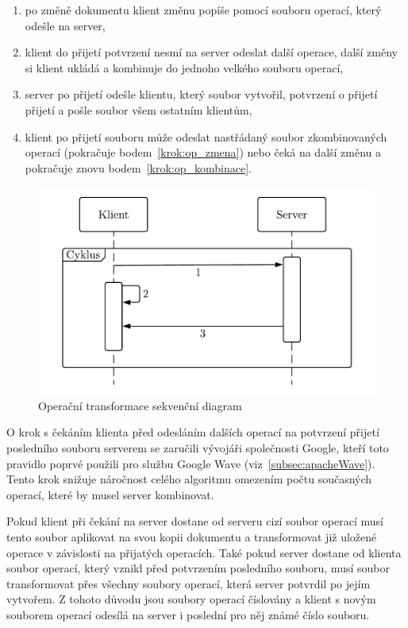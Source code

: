 \begin{enumerate}
    \item po změně dokumentu klient změnu popíše pomocí souboru operací, který odešle na server,\label{krok:op_zmena}
    \item klient do přijetí potvrzení nesmí na server odeslat další operace, další změny si klient ukládá a kombinuje do jednoho velkého souboru operací,\label{krok:op_kombinace}
    \item server po přijetí odešle klientu, který soubor vytvořil, potvrzení o přijetí přijetí a pošle soubor všem ostatním klientům,
    \item klient po přijetí souboru může odeslat nastřádaný soubor zkombinovaných operací (pokračuje bodem~\ref{krok:op_zmena}) nebo čeká na další změnu a pokračuje znovu bodem~\ref{krok:op_kombinace}.~\cite{ot:waveAddition}
\end{enumerate}

\begin{figure}[ht]
    \centering
    \includegraphics[width=\textwidth]{partials/analyza/OP_diagram.pdf}
    \caption{Operační transformace sekvenční diagram}\label{fig:OP_diagram}
\end{figure}

O krok s čekáním klienta před odesláním dalších operací na potvrzení přijetí posledního souboru serverem se zaručili vývojáři společnosti Google, kteří toto pravidlo poprvé použili pro službu Google Wave (viz~\ref{subsec:apacheWave}).
Tento krok snižuje náročnost celého algoritmu omezením počtu současných operací, které by musel server kombinovat.~\cite{ot:waveAddition}

Pokud klient při čekání na server dostane od serveru cizí soubor operací musí tento soubor aplikovat na svou kopii dokumentu a transformovat již uložené operace v závislosti na přijatých operacích.
Také pokud server dostane od klienta soubor operací, který vznikl před potvrzením posledního souboru, musí soubor transformovat přes všechny soubory operací, která server potvrdil po jejím vytvořem.
Z tohoto důvodu jsou soubory operací číslovány a klient s novým souborem operací odesílá na server i poslední pro něj známé číslo souboru.

